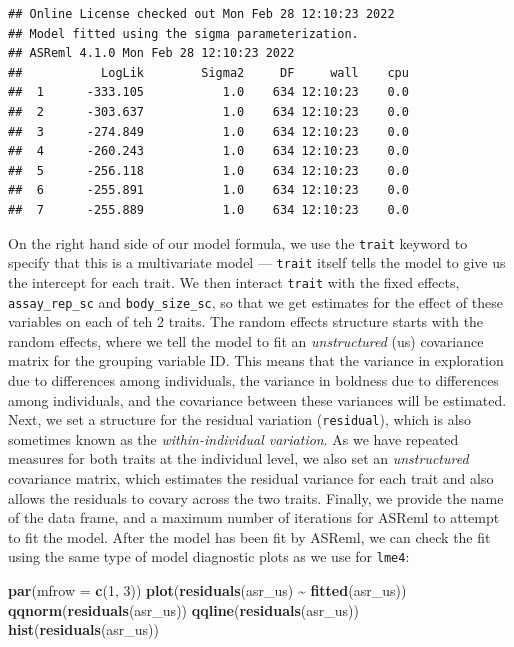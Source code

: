 \documentclass[
  12pt,
]{book}
\newenvironment{Shaded}{\begin{snugshade}}{\end{snugshade}}
\newcommand{\DataTypeTok}[1]{\textcolor[rgb]{0.13,0.29,0.53}{#1}}
\newcommand{\DecValTok}[1]{\textcolor[rgb]{0.00,0.00,0.81}{#1}}
\newcommand{\KeywordTok}[1]{\textcolor[rgb]{0.13,0.29,0.53}{\textbf{#1}}}
\newcommand{\NormalTok}[1]{#1}
\newcommand{\OperatorTok}[1]{\textcolor[rgb]{0.81,0.36,0.00}{\textbf{#1}}}
\newcommand{\StringTok}[1]{\textcolor[rgb]{0.31,0.60,0.02}{#1}}
\begin{document}
\begin{verbatim}
## Online License checked out Mon Feb 28 12:10:23 2022
## Model fitted using the sigma parameterization.
## ASReml 4.1.0 Mon Feb 28 12:10:23 2022
##           LogLik        Sigma2     DF     wall    cpu
##  1      -333.105           1.0    634 12:10:23    0.0
##  2      -303.637           1.0    634 12:10:23    0.0
##  3      -274.849           1.0    634 12:10:23    0.0
##  4      -260.243           1.0    634 12:10:23    0.0
##  5      -256.118           1.0    634 12:10:23    0.0
##  6      -255.891           1.0    634 12:10:23    0.0
##  7      -255.889           1.0    634 12:10:23    0.0
\end{verbatim}

On the right hand side of our model formula, we use the \texttt{trait} keyword to specify that this is a multivariate model --- \texttt{trait} itself tells the model to give us the intercept for each trait. We then interact \texttt{trait} with the fixed effects, \texttt{assay\_rep\_sc} and \texttt{body\_size\_sc}, so that we get estimates for the effect of these variables on each of teh 2 traits.
The random effects structure starts with the random effects, where we tell the model to fit an \emph{unstructured} (us) covariance matrix for the grouping variable ID. This means that the variance in exploration due to differences among individuals, the variance in boldness due to differences among individuals, and the covariance between these variances will be estimated.
Next, we set a structure for the residual variation (\texttt{residual}), which is also sometimes known as the \emph{within-individual variation}. As we have repeated measures for both traits at the individual level, we also set an \emph{unstructured} covariance matrix, which estimates the residual variance for each trait and also allows the residuals
to covary across the two traits.
Finally, we provide the name of the data frame, and a maximum number of iterations for ASReml to attempt to fit the model.
After the model has been fit by ASReml, we can check the fit using the same type of model diagnostic plots as we use for \texttt{lme4}:

\begin{Shaded}
\begin{Highlighting}[]
\KeywordTok{par}\NormalTok{(}\DataTypeTok{mfrow =} \KeywordTok{c}\NormalTok{(}\DecValTok{1}\NormalTok{, }\DecValTok{3}\NormalTok{))}
\KeywordTok{plot}\NormalTok{(}\KeywordTok{residuals}\NormalTok{(asr\_us) }\OperatorTok{\textasciitilde{}}\StringTok{ }\KeywordTok{fitted}\NormalTok{(asr\_us))}
\KeywordTok{qqnorm}\NormalTok{(}\KeywordTok{residuals}\NormalTok{(asr\_us))}
\KeywordTok{qqline}\NormalTok{(}\KeywordTok{residuals}\NormalTok{(asr\_us))}
\KeywordTok{hist}\NormalTok{(}\KeywordTok{residuals}\NormalTok{(asr\_us))}
\end{Highlighting}
\end{Shaded}
\end{document}
